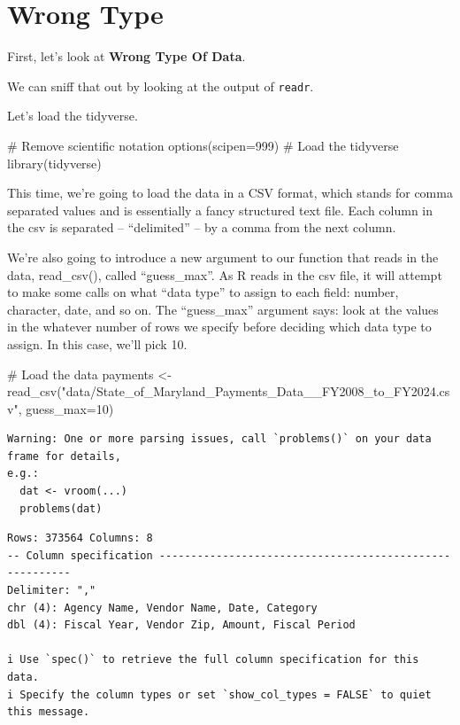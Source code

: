 \documentclass[
  letterpaper,
  DIV=11,
  numbers=noendperiod]{scrreprt}
\newenvironment{Shaded}{\begin{snugshade}}{\end{snugshade}}
\newcommand{\AttributeTok}[1]{\textcolor[rgb]{0.40,0.45,0.13}{#1}}
\newcommand{\CommentTok}[1]{\textcolor[rgb]{0.37,0.37,0.37}{#1}}
\newcommand{\DecValTok}[1]{\textcolor[rgb]{0.68,0.00,0.00}{#1}}
\newcommand{\FunctionTok}[1]{\textcolor[rgb]{0.28,0.35,0.67}{#1}}
\newcommand{\NormalTok}[1]{\textcolor[rgb]{0.00,0.23,0.31}{#1}}
\newcommand{\OtherTok}[1]{\textcolor[rgb]{0.00,0.23,0.31}{#1}}
\newcommand{\StringTok}[1]{\textcolor[rgb]{0.13,0.47,0.30}{#1}}
\begin{document}
\hypertarget{wrong-type}{%
\section{Wrong Type}\label{wrong-type}}

First, let's look at \textbf{Wrong Type Of Data}.

We can sniff that out by looking at the output of \texttt{readr}.

Let's load the tidyverse.

\begin{Shaded}
\begin{Highlighting}[]
\CommentTok{\# Remove scientific notation}
\FunctionTok{options}\NormalTok{(}\AttributeTok{scipen=}\DecValTok{999}\NormalTok{)}
\CommentTok{\# Load the tidyverse}
\FunctionTok{library}\NormalTok{(tidyverse)}
\end{Highlighting}
\end{Shaded}

This time, we're going to load the data in a CSV format, which stands
for comma separated values and is essentially a fancy structured text
file. Each column in the csv is separated -- ``delimited'' -- by a comma
from the next column.

We're also going to introduce a new argument to our function that reads
in the data, read\_csv(), called ``guess\_max''. As R reads in the csv
file, it will attempt to make some calls on what ``data type'' to assign
to each field: number, character, date, and so on. The ``guess\_max''
argument says: look at the values in the whatever number of rows we
specify before deciding which data type to assign. In this case, we'll
pick 10.

\begin{Shaded}
\begin{Highlighting}[]
\CommentTok{\# Load the data}
\NormalTok{payments }\OtherTok{\textless{}{-}} \FunctionTok{read\_csv}\NormalTok{(}\StringTok{"data/State\_of\_Maryland\_Payments\_Data\_\_FY2008\_to\_FY2024.csv"}\NormalTok{, }\AttributeTok{guess\_max=}\DecValTok{10}\NormalTok{)}
\end{Highlighting}
\end{Shaded}

\begin{verbatim}
Warning: One or more parsing issues, call `problems()` on your data frame for details,
e.g.:
  dat <- vroom(...)
  problems(dat)
\end{verbatim}

\begin{verbatim}
Rows: 373564 Columns: 8
-- Column specification --------------------------------------------------------
Delimiter: ","
chr (4): Agency Name, Vendor Name, Date, Category
dbl (4): Fiscal Year, Vendor Zip, Amount, Fiscal Period

i Use `spec()` to retrieve the full column specification for this data.
i Specify the column types or set `show_col_types = FALSE` to quiet this message.
\end{verbatim}
\end{document}
